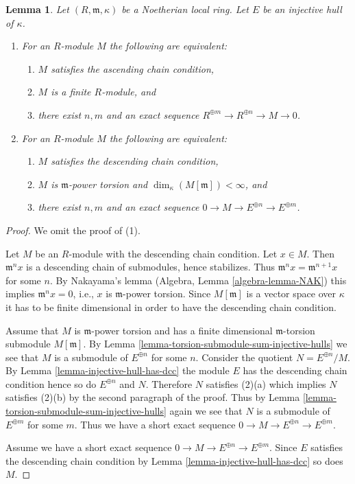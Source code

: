 \documentclass{stacks-project}
\theoremstyle{plain}
\newtheorem{lemma}[subsection]{Lemma}
\theoremstyle{definition}
\theoremstyle{remark}
\numberwithin{equation}{subsection}
\begin{document}
\begin{lemma}
\label{lemma-describe-categories}
Let $(R, \mathfrak m, \kappa)$ be a Noetherian local ring.
Let $E$ be an injective hull of $\kappa$.
\begin{enumerate}
\item For an $R$-module $M$ the following are equivalent:
\begin{enumerate}
\item $M$ satisfies the ascending chain condition,
\item $M$ is a finite $R$-module, and
\item there exist $n, m$ and an exact sequence
$R^{\oplus m} \to R^{\oplus n} \to M \to 0$.
\end{enumerate}
\item For an $R$-module $M$ the following are equivalent:
\begin{enumerate}
\item $M$ satisfies the descending chain condition,
\item $M$ is $\mathfrak m$-power torsion and
$\dim_\kappa(M[\mathfrak m]) < \infty$, and
\item there exist $n, m$ and an exact sequence
$0 \to M \to E^{\oplus n} \to E^{\oplus m}$.
\end{enumerate}
\end{enumerate}
\end{lemma}

\begin{proof}
We omit the proof of (1).

\medskip\noindent
Let $M$ be an $R$-module with the descending chain condition. Let $x \in M$.
Then $\mathfrak m^n x$ is a descending chain of submodules, hence stabilizes.
Thus $\mathfrak m^nx = \mathfrak m^{n + 1}x$ for some $n$. By Nakayama's lemma
(Algebra, Lemma \ref{algebra-lemma-NAK}) this implies $\mathfrak m^n x = 0$,
i.e., $x$ is $\mathfrak m$-power torsion. Since $M[\mathfrak m]$ is a vector
space over $\kappa$ it has to be finite dimensional in order to have the
descending chain condition.

\medskip\noindent
Assume that $M$ is $\mathfrak m$-power torsion and has a finite dimensional
$\mathfrak m$-torsion submodule $M[\mathfrak m]$. By
Lemma \ref{lemma-torsion-submodule-sum-injective-hulls}
we see that $M$ is a submodule of $E^{\oplus n}$ for some $n$.
Consider the quotient $N = E^{\oplus n}/M$. By
Lemma \ref{lemma-injective-hull-has-dcc} the module $E$ has the
descending chain condition hence so do $E^{\oplus n}$ and $N$.
Therefore $N$ satisfies (2)(a) which implies $N$ satisfies
(2)(b) by the second paragraph of the proof. Thus by
Lemma \ref{lemma-torsion-submodule-sum-injective-hulls}
again we see that $N$ is a submodule of $E^{\oplus m}$ for some $m$.
Thus we have a short exact sequence
$0 \to M \to E^{\oplus n} \to E^{\oplus m}$.

\medskip\noindent
Assume we have a short exact sequence
$0 \to M \to E^{\oplus n} \to E^{\oplus m}$.
Since $E$ satisfies the descending chain condition by
Lemma \ref{lemma-injective-hull-has-dcc}
so does $M$.
\end{proof}
\end{document}
